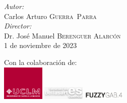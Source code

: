 \begin{titlepage}
\emph{Autor:}\\
Carlos Arturo \textsc{Guerra~Parra} %
\\[0.5cm]
\emph{Director:} \\
Dr. José Manuel \textsc{Berenguer Alarcón} %
\\[0.5cm]



{\large 1 de noviembre de 2023} %


 

\vfill %

{\scriptsize Con la colaboración de:}\\[0.2cm]
\includegraphics[width=0.15\textwidth]{./portada/logoUCLM}
\includegraphics[width=0.15\textwidth]{./portada/logoBellasartes}
\includegraphics[width=0.15\textwidth]{./portada/logoFuzzyGab}

\end{titlepage}